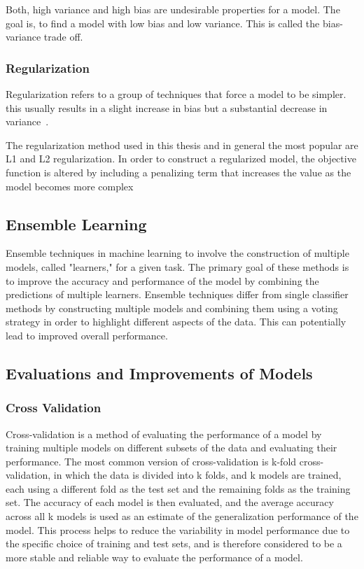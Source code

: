 Both, high variance and high bias are undesirable properties for a model. The goal is, to find a
model with low bias and low variance. This is called the bias-variance trade off. \cite[p.
9]{neal_biasvariancetradeofftextbooks_2019}

\subsubsection*{Regularization}
Regularization refers to a group of techniques that force a model to be simpler.
this usually results in a slight increase in bias but a substantial decrease in variance~\cite[p.
12]{burkov2019hundred}.

The regularization method used in this thesis and in general the most popular are L1 and L2
regularization.
In order to construct a regularized model, the objective function is altered by including a
penalizing term that increases the value as the model becomes more complex~\cite[p.
12]{burkov2019hundred}

\subsection{Ensemble Learning}\label{subsec:ensemble-learning}
Ensemble techniques in machine learning to involve the construction of multiple models, called
"learners," for a given task. The primary goal of these methods is to improve the accuracy and
performance of the model by combining the predictions of multiple learners. Ensemble techniques
differ from single classifier methods by constructing multiple models and combining them using a
voting strategy in order to highlight different aspects of the data. This can potentially lead to
improved overall performance. \cite[p. 253]{shaik_briefsurveyrandom_2019}

\subsection{Evaluations and Improvements of Models}

\subsubsection{Cross Validation}
Cross-validation is a method of evaluating the performance of a model by training multiple models
on different subsets of the data and evaluating their performance. The most common version of
cross-validation is k-fold cross-validation, in which the data is divided into k folds, and k
models are trained, each using a different fold as the test set and the remaining folds as the
training set.
The accuracy of each model is then evaluated, and the average accuracy across all k models is
used as an estimate of the generalization performance of the model. This process helps to reduce
the variability in model performance due to the specific choice of training and test sets, and is
therefore considered to be a more stable and reliable way to evaluate the performance of a model.
\cite[p. 252-260]{muller_introductionmachinelearning_2016}

